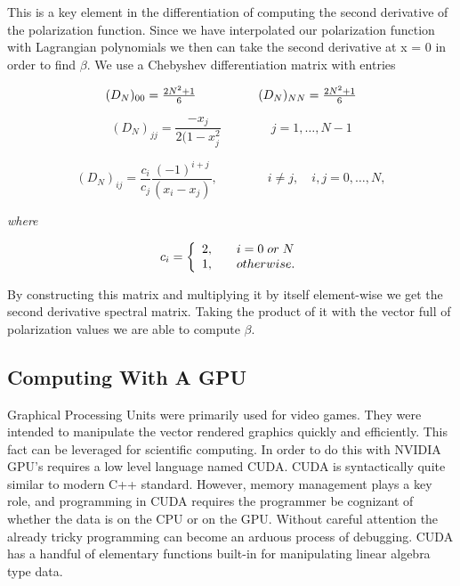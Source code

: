 \documentclass{report}
\theoremstyle{definition}
\begin{document}
This is a key element in the differentiation of computing the second derivative of the polarization function. Since we have interpolated our polarization function with Lagrangian polynomials we then can take the second derivative at x = 0 in order to find $\beta$. We use a Chebyshev differentiation matrix with entries 

\begin{equation}
\begin{array}{c c}
(D_{N})_{00} = \frac{2N^{2}+1}{6} & \qquad \qquad (D_{N})_{NN} = \frac{2N^{2}+1}{6} \\
\end{array}
\end{equation}


\begin{equation}
(D_{N})_{jj} = \frac{-x_{j}}{2(1-x_{j}^{2}} \qquad \qquad j = 1,\dots,N-1
\end{equation}

\begin{equation}
(D_{N})_{ij} = \frac{c_{i}}{c_{j}} \frac{(-1)^{i+j}}{(x_{i} - x_{j})}, \qquad \qquad i \neq j, \quad i,j = 0,\dots, N,
\end{equation}

\textit{where}

\begin{equation}
c_{i} = \left\{ 
  \begin{array}{l l}
    2, & \quad i = 0\; or \; N \\
    1, & \quad otherwise.\\
  \end{array} \right.
\end{equation}

By constructing this matrix and multiplying it by itself element-wise we get the second derivative spectral matrix. Taking the product of it with the vector full of polarization values we are able to compute $\beta$. 



\subsection*{Computing With A GPU}
Graphical Processing Units were primarily used for video games. They were intended to manipulate the vector rendered graphics quickly and efficiently. This fact can be leveraged for scientific computing. In order to do this with NVIDIA GPU's requires a low level language named CUDA. CUDA is syntactically quite similar to modern C++ standard. However, memory management plays a key role, and  programming in CUDA  requires the programmer be cognizant of whether the data is on the CPU or on the GPU. Without careful attention the already tricky programming can become an arduous process of debugging. CUDA has a handful of elementary functions built-in for manipulating linear algebra type data. %
\end{document}
